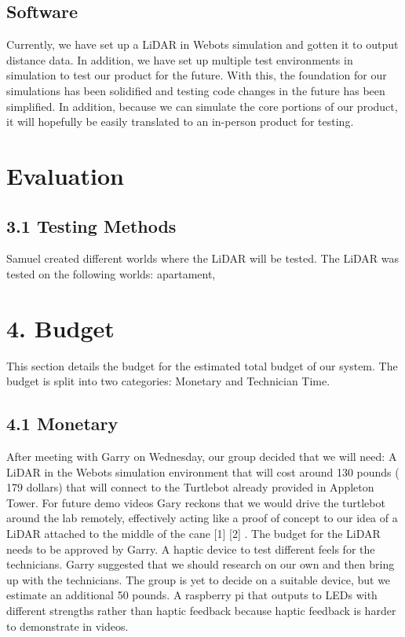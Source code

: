 \documentclass{article}
\begin{document}
\subsection{ Software}
Currently, we have set up a LiDAR in Webots simulation and gotten it to output distance data. In addition, we have set up multiple test environments in simulation to test our product for the future. With this, the foundation for our simulations has been solidified and testing code changes in the future has been simplified. In addition, because we can simulate the core portions of our product, it will hopefully be easily translated to an in-person product for testing.


\section{Evaluation}

\subsection{3.1 Testing Methods}

Samuel created different worlds where the LiDAR will be tested. The LiDAR was tested on the following worlds: apartament, 

\section{4. Budget}
This section details the budget for the estimated total budget of our system. The budget is split into two categories:  Monetary and Technician Time. 

\subsection{4.1 Monetary}
After meeting with Garry on Wednesday, our group decided that we will need: 
A LiDAR in the Webots simulation environment that will cost around 130 pounds ( 179 dollars)  that will connect to the Turtlebot  already provided in Appleton Tower. For future demo videos Gary reckons that we would drive the turtlebot around the lab remotely, effectively acting like a proof of concept to our idea of a LiDAR attached to the middle of the cane  [1] [2] .  The budget for the LiDAR needs to be approved by Garry. 
A haptic device to test different feels for the technicians. Garry suggested that we should research on our own and then bring up with the technicians. The group is yet to decide on a  suitable device, but we estimate an additional 50 pounds. 
A raspberry pi that outputs to LEDs with different strengths rather than haptic feedback because haptic feedback is harder to demonstrate in videos. 
\end{document}
